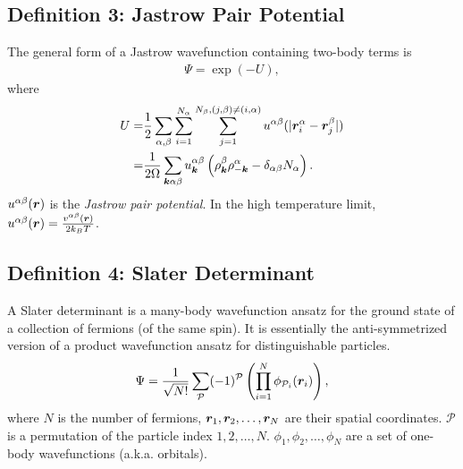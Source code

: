 \subsection{Definition 3: Jastrow Pair Potential}
The general form of a Jastrow wavefunction containing two-body terms is
\begin{align}
\Psi = \exp\left(-U\right),
\end{align}
where
\begin{align}
U =& \frac{1}{2}\sum\limits_{\alpha, \beta} \sum\limits_{i=1}^{N_\alpha} \sum\limits_{j=1}^{N_\beta, (j,\beta)\neq(i,\alpha)} 
u^{\alpha\beta}(\vert\boldsymbol{r}_i^\alpha - \boldsymbol{r}_j^\beta \vert) \nonumber \\
=& \frac{1}{2\Omega} \sum\limits_{\boldsymbol{k}\alpha\beta}
u^{\alpha\beta}_{\boldsymbol{k}} \left( \rho^\beta_{\boldsymbol{k}}\rho^\alpha_{-\boldsymbol{k}}-\delta_{\alpha\beta}N_\alpha \right).
\end{align}
$u^{\alpha\beta}(\boldsymbol{r})$ is the \emph{Jastrow pair potential}. In the high temperature limit, $u^{\alpha\beta}(\boldsymbol{r})=\frac{v^{\alpha\beta}(\boldsymbol{r})}{2k_BT}$.

\subsection{Definition 4: Slater Determinant}
A Slater determinant is a many-body wavefunction ansatz for the ground state of a collection of fermions (of the same spin). It is essentially the anti-symmetrized version of a product wavefunction ansatz for distinguishable particles.
\begin{align}
\Psi = \frac{1}{\sqrt{N!}}\sum\limits_{\mathcal{P}} (-1)^{\mathcal{P}} \left( \prod\limits_{i=1}^N \phi_{\mathcal{P}_i}(\boldsymbol{r}_i) \right),\label{eq:det}
\end{align}
where $N$ is the number of fermions, $\boldsymbol{r}_1, \boldsymbol{r}_2, \dots, \boldsymbol{r}_N$ are their spatial coordinates. $\mathcal{P}$ is a permutation of the particle index $1, 2, \dots, N$. $\phi_1, \phi_2, \dots, \phi_N$ are a set of one-body wavefunctions (a.k.a. orbitals).

